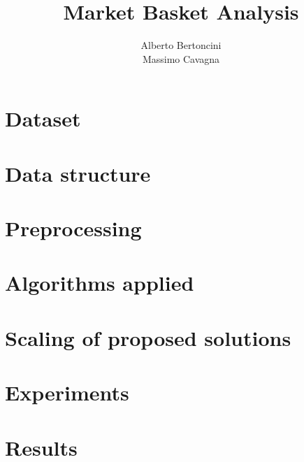 \documentclass[14pt]{extarticle}
\title{{\Huge Market Basket Analysis}}
\author{{\huge Alberto Bertoncini}\\{\huge Massimo Cavagna}}
\begin{document}
\maketitle
\newpage
\tableofcontents
\newpage

\section{Dataset}
\section{Data structure}
\section{Preprocessing}
\section{Algorithms applied}
\section{Scaling of proposed solutions}
\section{Experiments}
\section{Results}

\begin{comment}
The report should contain the following information:

-the chosen dataset, and the parts of the latter which have been considered,
-how data have been organized,
-the applied pre-processing techniques,
-the considered algorithms and their implementations,
-how the proposed solution scales up with data size,
-a description of the experiments,
-comments and discussion on the experimental results.

\end{comment}
\end{document}
